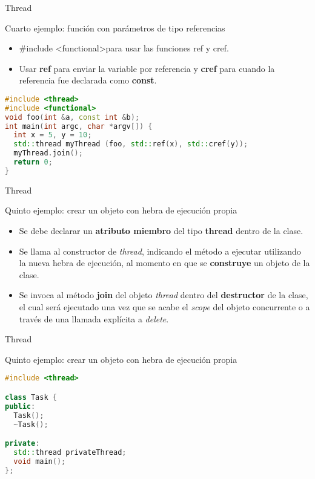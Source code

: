 \begin{frame}[fragile]{Thread}
\begin{block}{Cuarto ejemplo: función con parámetros de tipo referencias}
\begin{itemize}
  \item \#include \textless functional\textgreater  para usar las funciones ref y cref.
  \item Usar \textbf{ref} para enviar la variable por referencia y \textbf{cref} para cuando la referencia fue declarada como \textbf{const}.
\end{itemize}
\begin{lstlisting}[language=C++, basicstyle=\small]
#include <thread>
#include <functional>
void foo(int &a, const int &b);
int main(int argc, char *argv[]) {
  int x = 5, y = 10;
  std::thread myThread (foo, std::ref(x), std::cref(y));
  myThread.join();
  return 0;
}
\end{lstlisting}
\end{block}
\end{frame}

\begin{frame}{Thread}
\begin{block}{Quinto ejemplo: crear un objeto con hebra de ejecución propia}
\begin{itemize}
  \item Se debe declarar un \textbf{atributo miembro} del tipo \textbf{thread} dentro de la clase.
  \item Se llama al constructor de \textit{thread}, indicando el método a ejecutar utilizando la nueva hebra de ejecución, al momento en que se \textbf{construye} un objeto de la clase.
  \item Se invoca al método \textbf{join} del objeto \textit{thread} dentro del \textbf{destructor} de la clase, el cual será ejecutado una vez que se acabe el \textit{scope} del objeto concurrente o a través de una llamada explícita a \textit{delete}.
\end{itemize}
\end{block}
\end{frame}

\begin{frame}[fragile]{Thread}
\begin{block}{Quinto ejemplo: crear un objeto con hebra de ejecución propia}
\begin{lstlisting}[language=C++, basicstyle=\small]
#include <thread>

class Task {
public:
  Task();
  ~Task();

private:
  std::thread privateThread;
  void main();
};
\end{lstlisting}
\end{block}
\end{frame}

